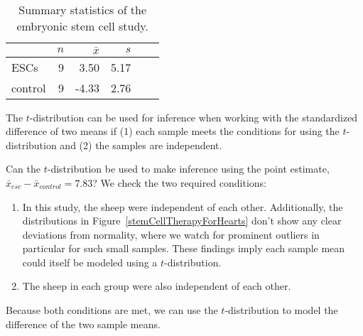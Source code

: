 {\begin{table}[h]
\centering
\begin{tabular}{l rrrrr}
\hline
\hspace{10mm}	& $n$	& $\bar{x}$	& $s$  	 \\
\hline
ESCs		& 9		& 3.50		& 5.17  	\\
control		& 9		& -4.33		& 2.76  	 \\
\hline
\end{tabular}
\caption{Summary statistics of the embryonic stem cell study.}
\label{summaryStatsForSheepHeartDataWhoReceivedMiceESCs}
\end{table}


\begin{termBox}{
\label{ConditionsForTwoSampleTDist}The $t$-distribution can be used for inference when working with the standardized difference of two means if (1) each sample meets the conditions for using the $t$-distribution and (2) the samples are independent.}
\end{termBox}

\begin{example}{Can the $t$-distribution be used to make inference using the point estimate, $\bar{x}_{esc} - \bar{x}_{control} = 7.83$?}
We check the two required conditions:
\begin{enumerate}
\item In this study, the sheep were independent of each other. Additionally, the distributions in Figure~\ref{stemCellTherapyForHearts} don't show any clear deviations from normality, where we watch for prominent outliers in particular for such small samples. These findings imply each sample mean could itself be modeled using a $t$-distribution.
\item The sheep in each group were also independent of each other.
\end{enumerate}
Because both conditions are met, we can use the $t$-distribution to model the difference of the two sample means.
\end{example}

}

